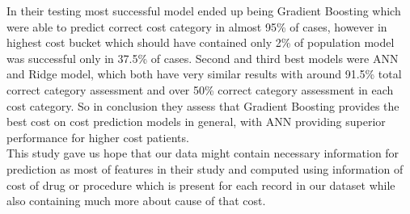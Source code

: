 In their testing most successful model ended up being Gradient Boosting which were able to predict correct cost category in almost 95\% of cases, however in highest cost bucket which should have contained only 2\% of population model was successful only in 37.5\% of cases. Second and third best models were ANN and Ridge model, which both have very similar results with around 91.5\% total correct category assessment and over 50\% correct category assessment in each cost category. So in conclusion they assess that Gradient Boosting provides the best cost on cost prediction models in general, with ANN providing superior performance for higher cost patients.
\\

This study gave us hope that our data might contain necessary information for prediction as most of features in their study and computed using information of cost of drug or procedure which is present for each record in our dataset while also containing much more about cause of that cost.